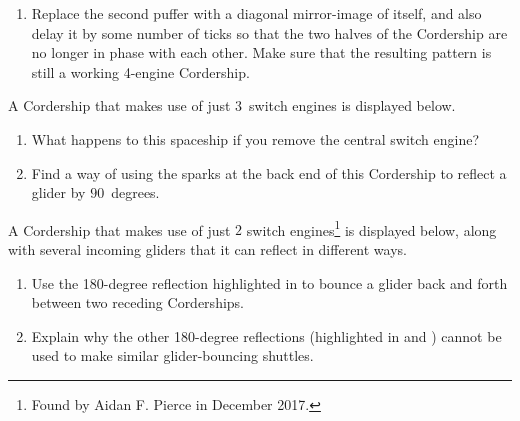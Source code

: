 \begin{multicols}{2}
\begin{problem}
\begin{enumerate}[label=\bf\color{ocre}(\alph*)]
			\item Replace the second puffer with a diagonal mirror-image of itself, and also delay it by some number of ticks so that the two halves of the Cordership are no longer in phase with each other. Make sure that the resulting pattern is still a working 4-engine Cordership.
		\end{enumerate}
	\end{problem}
	
	
	\mfilbreak
	
	
	\begin{problemstar}\label{exer:3_engine_cordership} 
		A Cordership that makes use of just $3$~switch engines is displayed below.
		
		\begin{center}
		\end{center}
		
		\begin{enumerate}[label=\bf\color{ocre}(\alph*)]
			\item What happens to this spaceship if you remove the central switch engine?
			
			\item Find a way of using the sparks at the back end of this Cordership to reflect a glider by $90$~degrees. %
		\end{enumerate}
	\end{problemstar}
	
	
	\mfilbreak
	
	
	\begin{problemstar}\label{exer:2_engine_cordership} 
		A Cordership that makes use of just $2$ switch engines\footnote{Found by Aidan F. Pierce in December 2017.} is displayed below, along with several incoming gliders that it can reflect in different ways.
		
		\begin{center}
		\end{center}
		
		\begin{enumerate}[label=\bf\color{ocre}(\alph*)]
			\item Use the 180-degree reflection highlighted in  to bounce a glider back and forth between two receding Corderships.
			
			\item Explain why the other 180-degree reflections (highlighted in  and ) cannot be used to make similar glider-bouncing shuttles.
		\end{enumerate}
	\end{problemstar}
	

\end{multicols}
